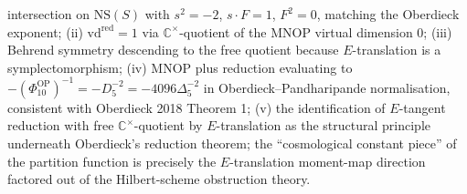 \begin{remark}
intersection on $\mathrm{NS}(S)$ with $s^2=-2$, $s\cdot F=1$, $F^2=0$,
matching the Oberdieck exponent;
\textup{(ii)} $\mathrm{vd}^{\mathrm{red}}=1$ via $\mathbb C^\times$-quotient
of the MNOP virtual dimension $0$;
\textup{(iii)} Behrend symmetry descending to the free quotient
because $E$-translation is a symplectomorphism;
	\textup{(iv)} MNOP plus reduction evaluating to
	$-(\Phi_{10}^{\mathrm{OP}})^{-1}=-D_5^{-2}
	=-4096\Delta_5^{-2}$ in Oberdieck--Pandharipande normalisation, consistent
with Oberdieck 2018 Theorem 1;
\textup{(v)} the identification of $E$-tangent reduction with
free $\mathbb C^\times$-quotient by $E$-translation as the structural
principle underneath Oberdieck's reduction theorem; the
``cosmological constant piece'' of the partition function is
precisely the $E$-translation moment-map direction factored out of the
Hilbert-scheme obstruction theory.
\end{remark}

